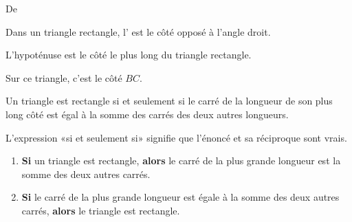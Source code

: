 

De \cite{NRHooXFvgpp4}

\begin{definition}
    Dans un triangle rectangle, l' est le côté opposé à l'angle droit.
\end{definition}
\begin{remark}
    L'hypoténuse est le côté le plus long du triangle rectangle.
\end{remark}

\begin{example}
    Sur ce triangle, c'est le côté \( BC\).
    \begin{center}
        
    \end{center}
\end{example}

\begin{theorem}[de Pythagore]
    Un triangle est rectangle si et seulement si le carré de la longueur de son plus long côté est égal à la somme des carrés des deux autres longueurs.
\end{theorem}

\begin{remark}
    L'expression «si et seulement si» signifie que l'énoncé et sa réciproque sont vrais.
    \begin{enumerate}
        \item
            {\bf Si} un triangle est rectangle, {\bf alors} le carré de la plus grande longueur est la somme des deux autres carrés.
        \item
            {\bf Si} le carré de la plus grande longueur est égale à la somme des deux autres carrés, {\bf alors} le triangle est rectangle.
    \end{enumerate}
\end{remark}

